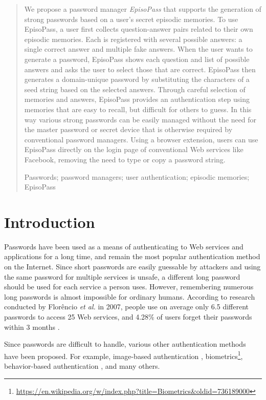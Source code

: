 \documentclass[runningheads,a4paper]{llncs}
\newcommand{\keywords}[1]{\par\addvspace\baselineskip
\noindent\keywordname\enspace\ignorespaces#1}
\begin{document}
\begin{abstract}
We propose a password manager \textit{EpisoPass} that supports the
generation of strong passwords based on a user's secret episodic
memories. To use EpisoPass, a user first collects question-answer
pairs related to their own episodic memories. Each is registered with
several possible answers: a single correct answer and multiple fake
answers. When the user wants to generate a password, EpisoPass shows
each question and list of possible answers and asks the user to select
those that are correct. EpisoPass then generates a domain-unique
password by substituting the characters of a seed string based on the
selected answers. Through careful selection of memories and answers,
EpisoPass provides an authentication step using memories that are easy
to recall, but difficult for others to guess. In this way various
strong passwords can be easily managed without the need for the master
password or secret device that is otherwise required by conventional
password managers. Using a browser extension, users can use EpisoPass
directly on the login page of conventional Web services like Facebook,
removing the need to type or copy a password string.

\keywords{Passwords; password managers; user authentication; episodic memories; EpisoPass}
\end{abstract}

\section{Introduction}

Passwords have been used as a means of authenticating to Web services and applications
for a long time, and remain the most popular authentication method on the Internet.
%
Since short passwords are easily guessable by attackers and
using the same password for multiple services is unsafe,
a different long password should be used for each service a person uses.
However, remembering numerous long passwords is almost impossible for ordinary humans.
%
According to research conducted by Flor\^{e}ncio {\it et al.\/} in 2007,
people use on average only 6.5 different passwords to access 25 Web services, and
4.28\% of users forget their passwords within 3 months \cite{Florencio:2007:LSW:1242572.1242661}.

Since passwords are difficult to handle, various other authentication methods have been proposed.
For example, image-based authentication \cite{Biddle:2012:GPL:2333112.2333114,GraphicalPasswords}, 
biometrics\footnote{
  \url{https://en.wikipedia.org/w/index.php?title=Biometrics&oldid=736189000}
},
behavior-based authentication \cite{Dandapat:2015:AYD:2702123.2702457}, and many others.
\end{document}
